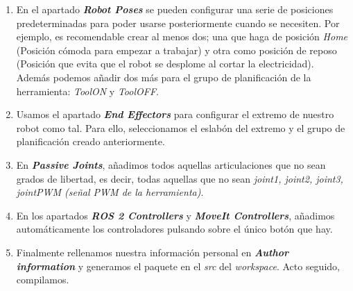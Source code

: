 \begin{enumerate}
\item En el apartado \textbf{\textit{\guillemotleft Robot Poses\guillemotright}} se pueden configurar una serie de posiciones predeterminadas 
para poder usarse posteriormente cuando se necesiten. Por ejemplo, es recomendable crear al menos dos; una que haga de posición \textit{Home} 
(Posición cómoda para empezar a trabajar) y otra como posición de reposo (Posición que evita que el robot se desplome al cortar la electricidad). Además 
podemos añadir dos más para el grupo de planificación de la herramienta: \textit{ToolON} y \textit{ToolOFF}.

\item Usamos el apartado \textbf{\textit{\guillemotleft End Effectors \guillemotright}} para configurar el extremo de nuestro robot como tal. Para ello, 
seleccionamos el eslabón del extremo y el grupo de planificación creado anteriormente. 

\item En \textbf{\textit{\guillemotleft Passive Joints\guillemotright}}, añadimos todos aquellas articulaciones que no sean grados de libertad, 
es decir, todas aquellas que no sean \textit{joint1, joint2, joint3, jointPWM (señal PWM de la herramienta)}.

\item En los apartados \textbf{\textit{\guillemotleft ROS 2 Controllers\guillemotright}} y 
\textbf{\textit{\guillemotleft MoveIt Controllers\guillemotright}}, añadimos automáticamente los controladores pulsando sobre el único botón que hay.

\item Finalmente rellenamos nuestra información personal en \textbf{\textit{\guillemotleft Author information\guillemotright}} y generamos el 
paquete en el \textit{src} del \textit{workspace}. Acto seguido, compilamos.
\end{enumerate}

